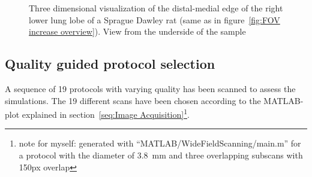 \begin{figure}
{%
	}%
	\caption{Three dimensional visualization of the distal-medial edge of the right lower lung lobe of a Sprague Dawley rat (same as in figure~\ref{fig:FOV increase overview}). View from the underside of the sample}%
	\label{fig:FOV increase segments}%
\end{figure}

\subsection{Quality guided protocol selection}
\cbstart
A sequence of 19 protocols with varying quality has been scanned to assess the simulations. The 19 different scans have been chosen according to the MATLAB-plot explained in section~\ref{seq:Image Acquisition}\footnote{note for myself: generated with ``MATLAB/WideFieldScanning/main.m'' for a protocol with the diameter of \SI{3.8}{mm} and three overlapping subscans with 150px overlap}.
\cbend

